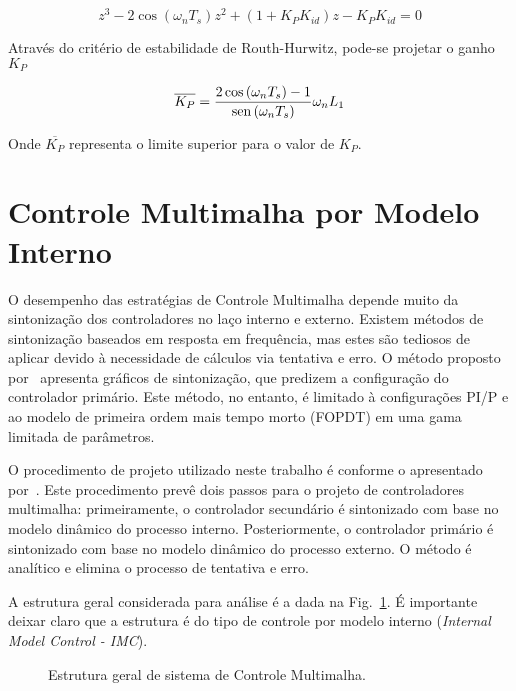     \begin{equation}
        z^3 - 2 \cos \left( \omega_n T_s \right) z^2 + \left( 1 + K_P K_{id} \right) z -
            K_P K_{id} = 0
    \end{equation}

    Através do critério de estabilidade de Routh-Hurwitz, pode-se projetar o ganho $K_P$

    \begin{equation}
        \overline{K_P} = \frac{2 \cos \left( \omega_n T_s \right) - 1}
            {\operatorname{sen} \left( \omega_n T_s \right)} \omega_n L_1
    \end{equation}

    Onde $\overline{K_P}$ representa o limite superior para o valor de $K_P$.


\section{Controle Multimalha por Modelo Interno}

    O desempenho das estratégias de Controle Multimalha depende muito da sintonização
    dos controladores no laço interno e externo. Existem métodos de sintonização
    baseados em resposta em frequência, mas estes são tediosos de aplicar devido
    à necessidade de cálculos via tentativa e erro. O método proposto
    por~\cite{ref:KRISHNA} apresenta gráficos de sintonização, que predizem a
    configuração do controlador primário. Este método, no entanto, é limitado
    à configurações PI/P e ao modelo de primeira ordem mais tempo morto (FOPDT)
    em uma gama limitada de parâmetros.

    O procedimento de projeto utilizado neste trabalho é conforme o apresentado
    por~\cite{ref:LEE}. Este procedimento prevê dois passos para o projeto de
    controladores multimalha: primeiramente, o controlador secundário é sintonizado
    com base no modelo dinâmico do processo interno. Posteriormente, o controlador
    primário é sintonizado com base no modelo dinâmico do processo externo. O
    método é analítico e elimina o processo de tentativa e erro.

    A estrutura geral considerada para análise é a dada na
    Fig.~\ref{fig:multiloop_lee}. É importante deixar claro que a estrutura é
    do tipo de controle por modelo interno (\textit{Internal Model Control - IMC}).

    \begin{figure}[htb]
        \centering{
            }%
        \renewcommand\figurename{Fig.}
        \caption{Estrutura geral de sistema de Controle Multimalha.}
        \label{fig:multiloop_lee}
    \end{figure}

